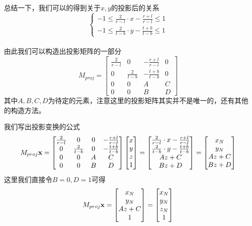 总结一下，我们可以的得到关于$x, y$的投影后的关系
\begin{displaymath}
\left\{
\begin{gathered}
-1 \leq \frac{2}{r - l}\cdot x - \frac{r + l}{r - l} \leq 1\\
-1 \leq \frac{2}{t - b}\cdot y - \frac{t + b}{t - b} \leq 1
\end{gathered}
\right.
\end{displaymath}
\\

由此我们可以构造出投影矩阵的一部分
\begin{displaymath}
M_{proj} = 
\begin{bmatrix}
\frac{2}{r - l} & 0  & -\frac{r + l}{r - l} & 0\\
0 & \frac{2}{t - b} & -\frac{t + b}{t - b} & 0\\
0 & 0 & A & C\\
0 & 0 & B & D
\end{bmatrix}
\end{displaymath}
其中$A, B, C, D$为待定的元素，注意这里的投影矩阵其实并不是唯一的，还有其他的构造方法。
\par
我们写出投影变换的公式
\begin{displaymath}
M_{proj}\bold{x} =
\begin{bmatrix}
\frac{2}{r - l} & 0  & 0 & -\frac{r + l}{r - l}\\
0 & \frac{2}{t - b} & 0 & -\frac{t + b}{t - b}\\
0 & 0 & A & C\\
0 & 0 & B & D
\end{bmatrix} 
\begin{bmatrix}
x\\
y\\
z\\
1
\end{bmatrix} =
\begin{bmatrix}
\frac{2}{r - l} \cdot x - \frac{r + l}{r - l}\\
\frac{2}{t - b} \cdot y - \frac{t + b}{t - b}\\
Az + C\\
Bz + D
\end{bmatrix} =
\begin{bmatrix}
x_N\\
y_N\\
Az + C\\
Bz + D
\end{bmatrix}
\end{displaymath}
这里我们直接令$B = 0, D = 1$可得
\begin{displaymath}
M_{proj}\bold{x} = 
\begin{bmatrix}
x_N\\
y_N\\
Az+C\\
1
\end{bmatrix} = 
\begin{bmatrix}
x_N\\
y_N\\
z_N\\
1
\end{bmatrix}
\end{displaymath}
